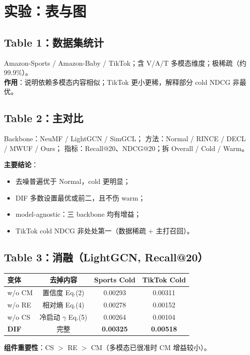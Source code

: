 \documentclass[11pt,a4paper]{ctexart}
\begin{document}
\section{实验：表与图}

\subsection{Table 1：数据集统计}
Amazon-Sports / Amazon-Baby / TikTok；含 V/A/T 多模态维度；极稀疏（约 99.9\%）。\\
\textbf{作用}：说明依赖多模态内容相似；TikTok 更小更稀，解释部分 cold NDCG 非最优。

\subsection{Table 2：主对比}
Backbone：NeuMF / LightGCN / SimGCL；
方法：Normal / RINCE / DECL / MWUF / Ours；
指标：Recall@20、NDCG@20；拆 Overall / Cold / Warm。

\textbf{主要结论}：
\begin{itemize}
  \item 去噪普遍优于 Normal，cold 更明显；
  \item DIF 多数设置最优或前二，且不伤 warm；
  \item model-agnostic：三 backbone 均有增益；
  \item TikTok cold NDCG 非处处第一（数据稀疏 + 主打召回）。
\end{itemize}

\subsection{Table 3：消融（LightGCN, Recall@20）}
\begin{center}
\small
\begin{tabular}{lccc}
\toprule
变体 & 去掉内容 & Sports Cold & TikTok Cold \\
\midrule
w/o CM & 置信度 Eq.(2) & 0.00293 & 0.00311 \\
w/o RE & 相对熵 Eq.(4) & 0.00278 & 0.00152 \\
w/o CS & 冷启动 $\gamma$ Eq.(5) & 0.00264 & 0.00104 \\
\textbf{DIF} & 完整 & \textbf{0.00325} & \textbf{0.00518} \\
\bottomrule
\end{tabular}
\end{center}
\textbf{组件重要性}：CS $>$ RE $>$ CM（多模态已很准时 CM 增益较小）。
\end{document}
